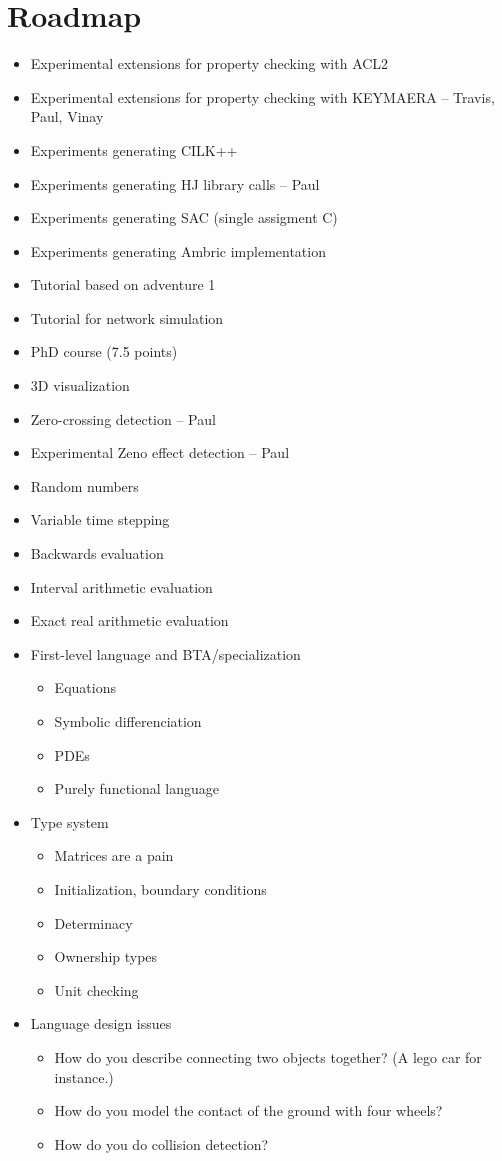 \section{Roadmap}
\begin{itemize}
    \item Experimental extensions for property checking with ACL2
    \item Experimental extensions for property checking with KEYMAERA -- Travis, Paul, Vinay
    \item Experiments generating CILK++
    \item Experiments generating HJ library calls -- Paul
    \item Experiments generating SAC (single assigment C)
    \item Experiments generating Ambric implementation
    \item Tutorial based on adventure 1
    \item Tutorial for network simulation
    \item PhD course (7.5 points)
    \item 3D visualization
    \item Zero-crossing detection -- Paul
    \item Experimental Zeno effect detection -- Paul
    \item Random numbers
    \item Variable time stepping
    \item Backwards evaluation
    \item Interval arithmetic evaluation
    \item Exact real arithmetic evaluation
    \item First-level language and BTA/specialization
\begin{itemize}
          \item Equations
          \item Symbolic differenciation
          \item PDEs
          \item Purely functional language 
\end{itemize}
    \item Type system
\begin{itemize}
          \item Matrices are a pain
          \item Initialization, boundary conditions
          \item Determinacy
          \item Ownership types
          \item Unit checking 
\end{itemize}
    \item Language design issues
\begin{itemize}
          \item How do you describe connecting two objects together? (A lego car for instance.)
          \item How do you model the contact of the ground with four wheels?
          \item How do you do collision detection? 
\end{itemize}
\end{itemize}
